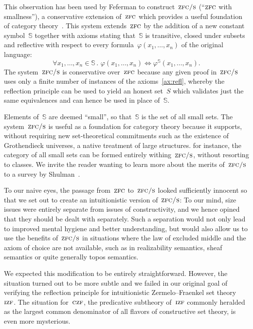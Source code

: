 \documentclass[oneside,reqno]{amsart}
\theoremstyle{definition}
\theoremstyle{plain}
\theoremstyle{remark}
\renewcommand{\SS}{\mathbb{S}}
\renewcommand{\_}{\mathpunct{.}\,}
\newcommand{\?}{\,{:}\,}
\newcommand{\IZF}{\textsc{izf}}
\newcommand{\CZF}{\textsc{czf}}
\newcommand{\ZFC}{\textsc{zfc}}
\newcommand{\ZFCS}{\textsc{zfc/s}}
\begin{document}
This observation has been used by Feferman to construct~$\ZFCS$ (``$\ZFC$ with
smallness''), a conservative extension of~$\ZFC$ which provides a useful
foundation of category theory~\cite{feferman:zfcs}. This system extends~$\ZFC$
by the addition of a new constant symbol~$\SS$ together with axioms stating
that~$\SS$ is transitive, closed under subsets and reflective with respect to
every formula~$\varphi(x_1,\ldots,x_n)$ of the original language:
\[ \label{ax:refl}\tag{$\star$}
\forall x_1,\ldots,x_n \in \SS\_ \varphi(x_1,\ldots,x_n) \Leftrightarrow
\varphi^{\SS}(x_1,\ldots,x_n). \]
The system~$\ZFCS$ is conservative over~$\ZFC$ because any given proof in~$\ZFCS$ uses
only a finite number of instances of the axioms~\eqref{ax:refl}, whereby the reflection
principle can be used to yield an honest set~$S$ which validates just the same equivalences
and can hence be used in place of~$\SS$.

Elements of~$\SS$ are deemed ``small'', so that~$\SS$ is the set of all small
sets. The system~$\ZFCS$ is useful as a foundation for category theory because
it supports, without requiring new set-theoretical commitments such as the
existence of Grothendieck universes, a native treatment of large structures.
for instance, the category of all small sets can be formed entirely
withing~$\ZFCS$, without resorting to classes. We invite the reader wanting
to learn more about the merits of~$\ZFCS$ to a survey by
Shulman~\cite[Section~11]{shulman:sets}.

To our naive eyes, the passage from~$\ZFC$ to~$\ZFCS$ looked sufficiently
innocent so that we set out to create an intuitionistic version of~$\ZFCS$: To
our mind, size issues were entirely separate from issues of constructivity, and
we hence opined that they should be dealt with separately. Such a separation
would not only lead to improved mental hygiene and better understanding, but
would also allow us to use the benefits
of~$\ZFCS$ in situations where the law of excluded middle and the axiom of
choice are not available, such as in realizability semantics, sheaf semantics
or quite generally topos semantics.

We expected this modification to be entirely straightforward. However, the
situation turned out to be more subtle and we failed in our original goal of
verifying the reflection principle for intuitionistic Zermelo--Fraenkel set
theory~$\IZF$. The situation for~$\CZF$, the predicative subtheory of~$\IZF$
commonly heralded as the largest common denominator of all flavors of
constructive set theory, is even more mysterious.
\end{document}
